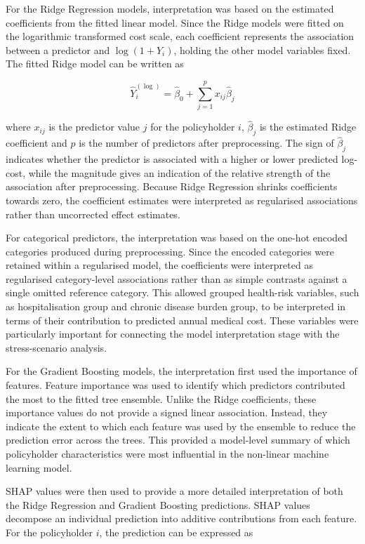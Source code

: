 	For the Ridge Regression models, interpretation was based on the estimated coefficients from the fitted linear model. Since the Ridge models were fitted on the logarithmic transformed cost scale, each coefficient represents the association between a predictor and \(\log(1 + Y_i)\), holding the other model variables fixed. The fitted Ridge model can be written as
	
	\begin{equation}
		\hat{Y}_i^{(\log)}
		=
		\hat{\beta}_0
		+
		\sum_{j=1}^{p}
		x_{ij}\hat{\beta}_j
	\end{equation}
	
	where \(x_{ij}\) is the predictor value \(j\) for the policyholder \(i\), \(\hat{\beta}_j\) is the estimated Ridge coefficient and \(p\) is the number of predictors after preprocessing. The sign of \(\hat{\beta}_j\) indicates whether the predictor is associated with a higher or lower predicted log-cost, while the magnitude gives an indication of the relative strength of the association after preprocessing. Because Ridge Regression shrinks coefficients towards zero, the coefficient estimates were interpreted as regularised associations rather than uncorrected effect estimates.
	
	For categorical predictors, the interpretation was based on the one-hot encoded categories produced during preprocessing. Since the encoded categories were retained within a regularised model, the coefficients were interpreted as regularised category-level associations rather than as simple contrasts against a single omitted reference category. This allowed grouped health-risk variables, such as hospitalisation group and chronic disease burden group, to be interpreted in terms of their contribution to predicted annual medical cost. These variables were particularly important for connecting the model interpretation stage with the stress-scenario analysis.
	
	For the Gradient Boosting models, the interpretation first used the importance of features. Feature importance was used to identify which predictors contributed the most to the fitted tree ensemble. Unlike the Ridge coefficients, these importance values do not provide a signed linear association. Instead, they indicate the extent to which each feature was used by the ensemble to reduce the prediction error across the trees. This provided a model-level summary of which policyholder characteristics were most influential in the non-linear machine learning model.
	
	SHAP values were then used to provide a more detailed interpretation of both the Ridge Regression and Gradient Boosting predictions. SHAP values decompose an individual prediction into additive contributions from each feature. For the policyholder \(i\), the prediction can be expressed as
	
